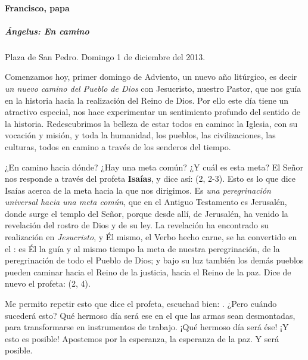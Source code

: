 \paragraph{Francisco, papa}\label{francisco-papa}

\subparagraph{Ángelus: En camino}\label{uxe1ngelus-en-camino}

Plaza de San Pedro. Domingo 1 de diciembre del 2013.

Comenzamos hoy, primer domingo de Adviento, un nuevo año litúrgico, es decir \emph{un nuevo camino del Pueblo de Dios} con Jesucristo, nuestro Pastor, que nos guía en la historia hacia la realización del Reino de Dios. Por ello este día tiene un atractivo especial, nos hace experimentar un sentimiento profundo del sentido de la historia. Redescubrimos la belleza de estar todos en camino: la Iglesia, con su vocación y misión, y toda la humanidad, los pueblos, las civilizaciones, las culturas, todos en camino a través de los senderos del tiempo.

¿En camino hacia dónde? ¿Hay una meta común? ¿Y cuál es esta meta? El Señor nos responde a través del profeta \textbf{Isaías}, y dice así:  (2, 2-3). Esto es lo que dice Isaías acerca de la meta hacia la que nos dirigimos. Es \emph{una peregrinación universal hacia una meta común}, que en el Antiguo Testamento es Jerusalén, donde surge el templo del Señor, porque desde allí, de Jerusalén, ha venido la revelación del rostro de Dios y de su ley. La revelación ha encontrado su realización en \emph{Jesucristo}, y Él mismo, el Verbo hecho carne, se ha convertido en el : es Él la guía y al mismo tiempo la meta de nuestra peregrinación, de la peregrinación de todo el Pueblo de Dios; y bajo su luz también los demás pueblos pueden caminar hacia el Reino de la justicia, hacia el Reino de la paz. Dice de nuevo el profeta:  (2, 4).

Me permito repetir esto que dice el profeta, escuchad bien: . ¿Pero cuándo sucederá esto? Qué hermoso día será ese en el que las armas sean desmontadas, para transformarse en instrumentos de trabajo. ¡Qué hermoso día será ése! ¡Y esto es posible! Apostemos por la esperanza, la esperanza de la paz. Y será posible.

